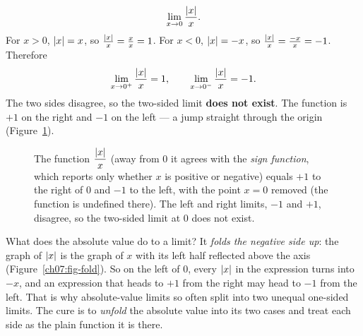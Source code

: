 \begin{example}
\label{ch07:ex-absx}
\[
  \lim_{x\to 0}\frac{\lvert x\rvert}{x}.
\]
For $x>0$, $\lvert x\rvert=x$, so $\frac{\lvert x\rvert}{x} = \frac{x}{x} = 1$. For $x<0$,
$\lvert x\rvert=-x$, so $\frac{\lvert x\rvert}{x} = \frac{-x}{x} = -1$. Therefore
\[
  \lim_{x\to 0^{+}}\frac{\lvert x\rvert}{x} = 1,
  \qquad
  \lim_{x\to 0^{-}}\frac{\lvert x\rvert}{x} = -1.
\]
The two sides disagree, so the two-sided limit \textbf{does not exist}. The
function is $+1$ on the right and $-1$ on the left --- a jump straight through
the origin (Figure~\ref{ch07:fig-absx}).
\end{example}

\begin{figure}[htbp]
\centering
{}
\caption{The function $\dfrac{\lvert x\rvert}{x}$ (away from $0$ it agrees with the \emph{sign function},
which reports only whether $x$ is positive or negative) equals $+1$ to the right of $0$
and $-1$ to the left, with the point $x=0$ removed (the function is undefined
there). The left and right limits, $-1$ and $+1$, disagree, so the two-sided
limit at $0$ does not exist.}
\label{ch07:fig-absx}
\end{figure}

\begin{happeningbox}
What does the absolute value do to a limit? It \emph{folds the negative
side up}: the graph of $\lvert x\rvert$ is the graph of $x$ with its left half
reflected above the axis (Figure~\ref{ch07:fig-fold}). So on the left of $0$, every $\lvert x\rvert$ in
the expression turns into $-x$, and an expression that heads to $+1$ from
the right may head to $-1$ from the left. That is
why absolute-value limits so often split into two unequal one-sided limits.
The cure is to \emph{unfold} the absolute value
into its two cases and treat each side as the plain function it is there.
\end{happeningbox}

